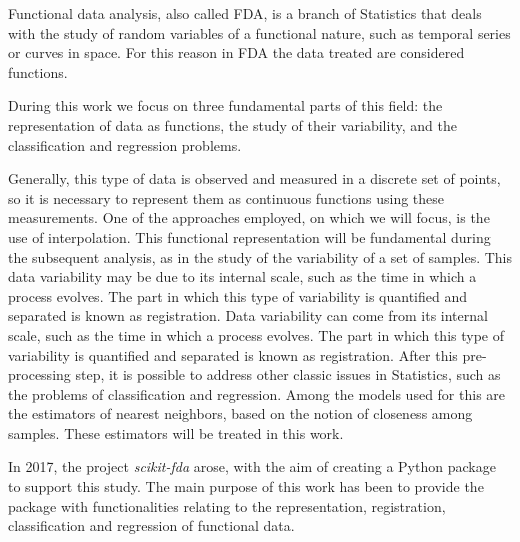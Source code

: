 Functional data analysis, also called FDA, is a branch of Statistics that deals
with the study of random variables of a functional nature, such as temporal
series or curves in space. For this reason in FDA the data treated are
considered functions.

During this work we focus on three fundamental parts of this field:
the representation of data as functions, the study of their variability,
and the classification and regression problems.

Generally, this type of data is observed and measured in a discrete set of
points, so it is necessary to represent them as continuous functions using
these measurements. One of the approaches employed, on which we will focus, is the
use of interpolation. This functional representation will be fundamental during
the subsequent analysis, as in the study of the variability of a set of samples.
This data variability may be due to its
internal scale, such as the time in which a process evolves.
The part in which this type of variability is quantified and separated is known
as registration.
Data variability can come from its internal scale,
such as the time in which a process evolves. The part in which this
type of variability is quantified and separated is known as registration.
After this pre-processing step, it is possible to address other classic
issues in Statistics, such as the problems of classification and regression.
Among the models used for this are the estimators of nearest neighbors,
based on the notion of closeness among samples. These estimators
will be treated in this work.

In 2017, the project \textit{scikit-fda} arose, with the aim of creating a
Python package to support this study. The main purpose of this work has been to
provide the package with functionalities relating to the representation,
registration, classification and regression of functional data.
